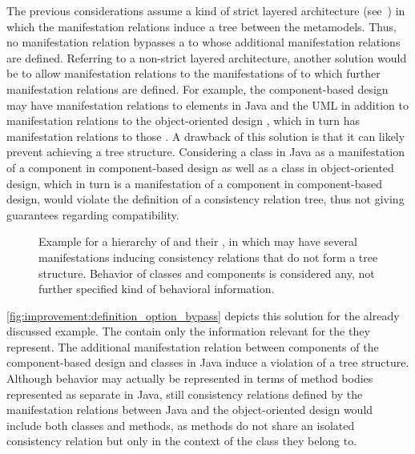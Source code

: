 The previous considerations assume a kind of strict layered architecture (see~\cite{buschmann1996PatternsArchitecture-Book}) in which the manifestation relations induce a tree between the metamodels.
Thus, no manifestation relation bypasses a \conceptmetamodel to whose \commonalities additional manifestation relations are defined.
Referring to a non-strict layered architecture, another solution would be to allow manifestation relations to the manifestations of \conceptmetamodels to which further manifestation relations are defined.
For example, the component-based design \commonalities may have manifestation relations to elements in Java and the \gls{UML} in addition to manifestation relations to the object-oriented design \conceptmetamodels, which in turn has manifestation relations to those \concretemetamodels.
A drawback of this solution is that it can likely prevent achieving a tree structure.
Considering a class in Java as a manifestation of a component in component-based design as well as a class in object-oriented design, which in turn is a manifestation of a component in component-based design, would violate the definition of a consistency relation tree, thus not giving guarantees regarding compatibility.

\begin{figure}
    \centering
    
    \caption[\Commonalities with multiple manifestations]{Example for a hierarchy of \conceptmetamodels and their \commonalities, in which \commonalities may have several manifestations inducing consistency relations that do not form a tree structure. Behavior of classes and components is considered any, not further specified kind of behavioral information.}
    \label{fig:improvement:definition_option_bypass}
\end{figure}

\autoref{fig:improvement:definition_option_bypass} depicts this solution for the already discussed example.
The \conceptmetamodels contain only the information relevant for the \commonalities they represent.
The additional manifestation relation between components of the component-based design \conceptmetamodel and classes in Java induce a violation of a tree structure.
Although behavior may actually be represented in terms of method bodies represented as separate \metaclasses in Java, still consistency relations defined by the manifestation relations between Java and the object-oriented design \conceptmetamodel would include both classes and methods, as methods do not share an isolated consistency relation but only in the context of the class they belong to.

